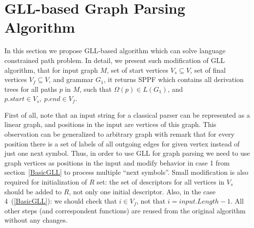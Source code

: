 \section{GLL-based Graph Parsing Algorithm}


In this section we propose GLL-based algorithm which can solve language constrained path problem.
In detail, we present such modification of GLL algorithm, that for input graph $M$, set of start vertices $V_s\subseteq V$, set of final vertices $V_f\subseteq V$, and grammar $G_1$, it returns SPPF which contains all derivation trees for all paths $p$ in $M$, such that $\Omega(p) \in L(G_1)$, and $p.start \in V_s,\ p.end \in V_f$.

First of all, note that an input string for a classical parser can be represented as a linear graph, and positions in the input are vertices of this graph.
This observation can be generalized to arbitrary graph with remark that for every position there is a set of labels of all outgoing edges for given vertex instead of just one next symbol. 
Thus, in order to use GLL for graph parsing we need to use graph vertices as positions in the input and modify behavior in case 1 from section~\ref{BasicGLL} to process multiple ``next symbols''.
Small modification is also required for initialization of $R$ set: the set of descriptors for all vertices in $V_s$ should be added to $R$, not only one initial descriptor.
Also, in the case 4~(\ref{BasicGLL}): we should check that $i \in V_f$, not that $i = input.Length - 1$.
All other steps (and correspondent functions) are reused from the original algorithm without any changes.

